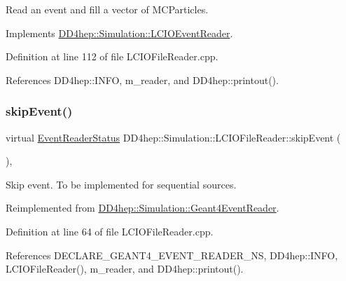 Read an event and fill a vector of M\+C\+Particles. 



Implements \hyperlink{class_d_d4hep_1_1_simulation_1_1_l_c_i_o_event_reader_a49acaafd98bbd6a954b29cfd9465d017}{D\+D4hep\+::\+Simulation\+::\+L\+C\+I\+O\+Event\+Reader}.



Definition at line 112 of file L\+C\+I\+O\+File\+Reader.\+cpp.



References D\+D4hep\+::\+I\+N\+FO, m\+\_\+reader, and D\+D4hep\+::printout().

\hypertarget{class_d_d4hep_1_1_simulation_1_1_l_c_i_o_file_reader_a4b14dad308419f968982e216c11bb15a}{}\label{class_d_d4hep_1_1_simulation_1_1_l_c_i_o_file_reader_a4b14dad308419f968982e216c11bb15a} 
\subsubsection{\texorpdfstring{skip\+Event()}{skipEvent()}}
{\footnotesize\ttfamily virtual \hyperlink{class_d_d4hep_1_1_simulation_1_1_geant4_event_reader_ae4f4bc83ffcf5b0c1868ad78859851e7}{Event\+Reader\+Status} D\+D4hep\+::\+Simulation\+::\+L\+C\+I\+O\+File\+Reader\+::skip\+Event (\begin{DoxyParamCaption}{ }\end{DoxyParamCaption})\hspace{0.3cm}{\ttfamily [inline]}, {\ttfamily [virtual]}}



Skip event. To be implemented for sequential sources. 



Reimplemented from \hyperlink{class_d_d4hep_1_1_simulation_1_1_geant4_event_reader_a9381626ad4f4fa20e304414f6654ee03}{D\+D4hep\+::\+Simulation\+::\+Geant4\+Event\+Reader}.



Definition at line 64 of file L\+C\+I\+O\+File\+Reader.\+cpp.



References D\+E\+C\+L\+A\+R\+E\+\_\+\+G\+E\+A\+N\+T4\+\_\+\+E\+V\+E\+N\+T\+\_\+\+R\+E\+A\+D\+E\+R\+\_\+\+NS, D\+D4hep\+::\+I\+N\+FO, L\+C\+I\+O\+File\+Reader(), m\+\_\+reader, and D\+D4hep\+::printout().



